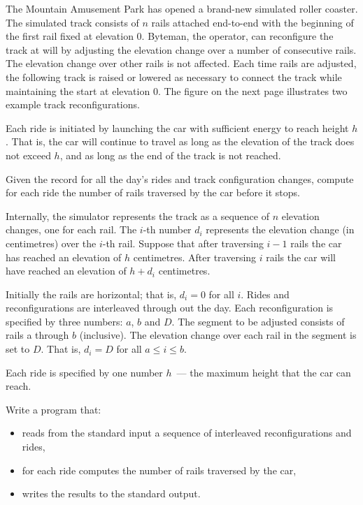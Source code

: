 The Mountain Amusement Park has opened a brand-new simulated roller coaster. The simulated track consists of $n$ rails attached end-to-end with the beginning of the first rail fixed at elevation $0$. Byteman, the
operator, can reconfigure the track at will by adjusting the elevation change over a number of consecutive
rails. The elevation change over other rails is not affected. Each time rails are adjusted, the following track is
raised or lowered as necessary to connect the track while maintaining the start at elevation $0$. The figure on
the next page illustrates two example track reconfigurations.

Each ride is initiated by launching the car with sufficient energy to reach height $h$. That is, the car will
continue to travel as long as the elevation of the track does not exceed $h$, and as long as the end of the track
is not reached.

Given the record for all the day's rides and track configuration changes, compute for each ride the number
of rails traversed by the car before it stops.

Internally, the simulator represents the track as a sequence of $n$ elevation changes, one for each rail. The
$i$-th number $d_i$ represents the elevation change (in centimetres) over the $i$-th rail. Suppose that after traversing
$i-1$ rails the car has reached an elevation of $h$ centimetres. After traversing $i$ rails the car will have reached
an elevation of $h+d_i$ centimetres.

Initially the rails are horizontal;  that is, $d_i = 0$ for all $i$. Rides and reconfigurations are interleaved through
out the day. Each reconfiguration is specified by three numbers: $a$, $b$ and $D$. The segment to be adjusted
consists of rails a through $b$ (inclusive). The elevation change over each rail in the segment is set to $D$. That
is, $d_i = D$ for all $a \le i \le b$.



Each ride is specified by one number $h$~--- the maximum height that the car can reach.

Write a program that:

\begin{itemize}
\item reads from the standard input a sequence of interleaved reconfigurations and rides,

\item for each ride computes the number of rails traversed by the car,

\item writes the results to the standard output.
\end{itemize}